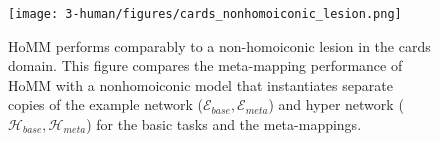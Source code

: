 \begin{figure}[htb]
\centering
\texttt{[image: 3-human/figures/cards\_nonhomoiconic\_lesion.png]}
\caption[HoMM performs comparably to a non-homoiconic lesion in the cards domain.]{HoMM performs comparably to a non-homoiconic lesion in the cards domain. This figure compares the meta-mapping performance of HoMM with a nonhomoiconic model that instantiates separate copies of the example network (\(\mathcal{E}_{base},\mathcal{E}_{meta}\)) and hyper network (\(\mathcal{H}_{base},\mathcal{H}_{meta}\)) for the basic tasks and the meta-mappings.} \label{supp_fig:HoMM:nonhomoiconic_baseline:cards}
\end{figure}

